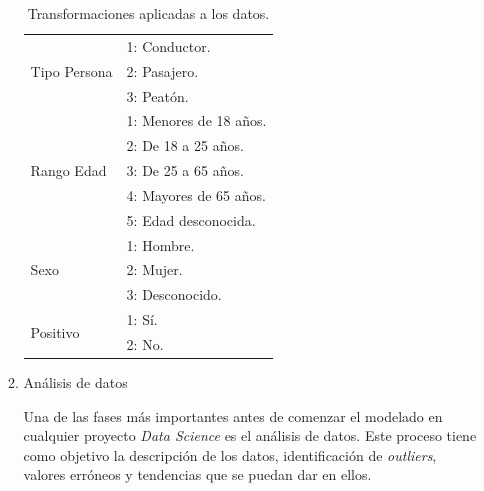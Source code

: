 \begin{enumerate}
\begin{enumerate}
\begin{table}[H]
\begin{tabular}{ll}
                           \midrule
                           \multirow{3}{*}{Tipo Persona}         & 1: Conductor.\\
                                                                 & 2: Pasajero.\\
                                                                 & 3: Peatón.\\
                           \midrule
                           \multirow{5}{*}{Rango Edad}           & 1: Menores de 18 años.\\
                                                                 & 2: De 18 a 25 años.\\
                                                                 & 3: De 25 a 65 años.\\
                                                                 & 4: Mayores de 65 años.\\
                                                                 & 5: Edad desconocida.\\
                           \midrule
                           \multirow{3}{*}{Sexo}                 & 1: Hombre.\\
                                                                 & 2: Mujer.\\
                                                                 & 3: Desconocido.\\
                           \midrule
                           \multirow{2}{*}{Positivo}             & 1: Sí.\\
                                                                 & 2: No.\\
                           \bottomrule
                      \end{tabular}
                      \caption{Transformaciones aplicadas a los datos.}
                      \label{TransformacionDatosTabla}
                    \end{table}
                    


                \item Análisis de datos

                    Una de las fases más importantes antes de comenzar el modelado en cualquier proyecto \textit{Data Science} es el análisis de datos. Este proceso tiene como objetivo la descripción de los datos, identificación de \textit{outliers}, valores erróneos y tendencias que se puedan dar en ellos.\\


\end{enumerate}
\end{enumerate}
